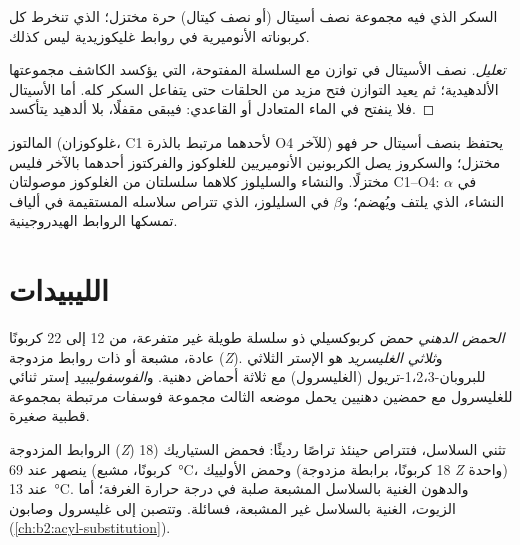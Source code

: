 \begin{proposition}[مختزل أم لا]\label{prop:b2:biomolecules:reducing}
السكر الذي فيه مجموعة نصف أسيتال (أو نصف كيتال) حرة مختزل؛  الذي تنخرط كل كربوناته
الأنوميرية في روابط غليكوزيدية ليس كذلك.
\end{proposition}

\begin{proof}[تعليل]
نصف الأسيتال في توازن مع السلسلة المفتوحة، التي يؤكسد الكاشف مجموعتها الألدهيدية؛
ثم يعيد التوازن فتح مزيد من الحلقات حتى يتفاعل السكر كله. أما الأسيتال فلا ينفتح في
الماء المتعادل أو القاعدي: فيبقى  مقفلًا، بلا ألدهيد يتأكسد.
\end{proof}

المالتوز (غلوكوزان، C1 لأحدهما مرتبط بالذرة O4 للآخر) يحتفظ بنصف أسيتال حر فهو مختزل؛ 
والسكروز يصل الكربونين الأنوميريين للغلوكوز والفركتوز أحدهما بالآخر فليس مختزلًا. والنشاء 
والسليلوز كلاهما سلسلتان من الغلوكوز موصولتان C1--O4: $\alpha$ في النشاء، الذي يلتف ويُهضم؛
و$\beta$ في السليلوز، الذي تتراص سلاسله المستقيمة في ألياف تمسكها الروابط الهيدروجينية.

\section{الليبيدات}

\begin{definition}[الليبيدات]\label{def:b2:biomolecules:lipid}
\emph{الحمض الدهني} حمض كربوكسيلي ذو سلسلة طويلة غير متفرعة، من 12 إلى
22 كربونًا عادة، مشبعة أو ذات روابط مزدوجة (\textit{Z}). و\emph{ثلاثي الغليسريد} هو
الإستر الثلاثي للبروبان-1،2،3-تريول (الغليسرول) مع ثلاثة أحماض دهنية. 
و\emph{الفوسفوليبيد} إستر ثنائي للغليسرول مع حمضين دهنيين يحمل موضعه
الثالث مجموعة فوسفات مرتبطة بمجموعة قطبية صغيرة.
\end{definition}

الروابط المزدوجة (\textit{Z}) تثني السلاسل، فتتراص حينئذ تراصًا رديئًا: فحمض الستياريك (18 كربونًا،
مشبع) ينصهر عند \qty{69}{\degreeCelsius}، وحمض الأولييك (18 كربونًا، برابطة مزدوجة \textit{Z} واحدة) عند
\qty{13}{\degreeCelsius}. والدهون الغنية بالسلاسل المشبعة صلبة في درجة حرارة الغرفة؛ أما الزيوت، الغنية
بالسلاسل غير المشبعة، فسائلة. وتتصبن  إلى غليسرول وصابون
(\cref{ch:b2:acyl-substitution}).

